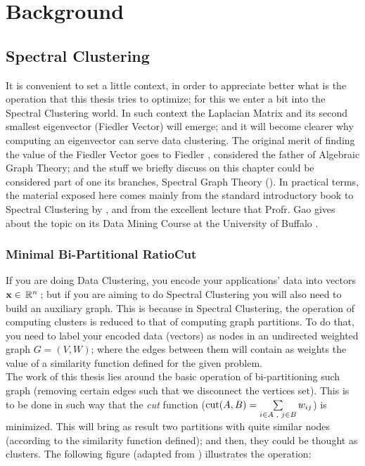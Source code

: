 \chapter{Background}

\section{Spectral Clustering}

It is convenient to set a little context, in order to appreciate
better what is the operation that this thesis tries to optimize; for
this we enter a bit into the Spectral Clustering world. In such
context the Laplacian Matrix and its second smallest eigenvector
(Fiedler Vector) will emerge; and it will become clearer why computing
an eigenvector can serve data clustering. The original merit of
finding the value of the Fiedler Vector goes to Fiedler
\cite{fiedler73}, considered the father of Algebraic Graph Theory; and
the stuff we briefly discuss on this chapter could be considered part
of one its branches, Spectral Graph Theory (\cite{brouwer12}). In
practical terms, the material exposed here comes mainly from the
standard introductory book to Spectral Clustering by \cite{luxburg07},
and from the excellent lecture that Profr. Gao gives about the topic on
its Data Mining Course at the University of Buffalo \cite{gao13}.

\subsection{Minimal Bi-Partitional RatioCut}

If you are doing Data Clustering, you encode your applications' data
into vectors $\mathbf{x} \in \,\mathbb{R}^{n}\,$; but if you are aiming to do Spectral
Clustering you will also need to build an auxiliary graph. This is
because in Spectral Clustering, the operation of computing clusters is
reduced to that of computing graph partitions. To do that, you need to
label your encoded data (vectors) as nodes in an undirected weighted graph $G =
(V,W)$; where the edges between them will contain as weights the value 
of a similarity function defined for the given problem. \\

The work of this thesis lies around the basic operation of
bi-partitioning such graph (removing certain edges such that we
disconnect the vertices set). This is to be done in such way that the
\emph{cut} function ($\operatorname{cut}(A,B) = \sum\limits_{\tiny{i \in A
    \ensuremath{\,\,,\,\,} j \in B}} w_{ij}$) is minimized. This will bring as result
two partitions with quite similar nodes (according to the similarity
function defined); and then, they could be thought as clusters. The
following figure (adapted from \cite{gao13}) illustrates the
operation:

